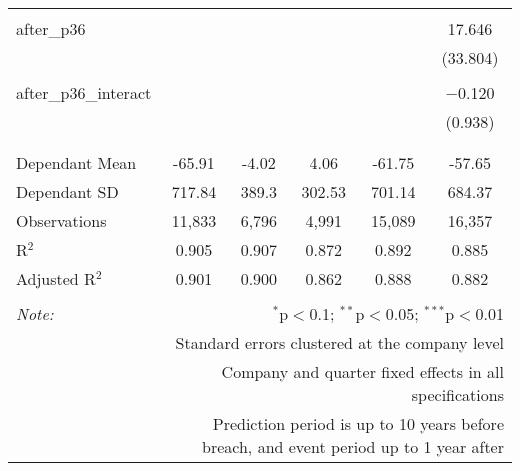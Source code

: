 \begin{table}[!htbp]
\begin{tabular}{@{\extracolsep{5pt}}lccccc}
  & & & & & \\ 
 after\_p36 &  &  &  &  & 17.646 \\ 
  &  &  &  &  & (33.804) \\ 
  & & & & & \\ 
 after\_p36\_interact &  &  &  &  & $-$0.120 \\ 
  &  &  &  &  & (0.938) \\ 
  & & & & & \\ 
\hline \\[-1.8ex] 
Dependant Mean & -65.91 & -4.02 & 4.06 & -61.75 & -57.65 \\ 
Dependant SD & 717.84 & 389.3 & 302.53 & 701.14 & 684.37 \\ 
Observations & 11,833 & 6,796 & 4,991 & 15,089 & 16,357 \\ 
R$^{2}$ & 0.905 & 0.907 & 0.872 & 0.892 & 0.885 \\ 
Adjusted R$^{2}$ & 0.901 & 0.900 & 0.862 & 0.888 & 0.882 \\ 
\hline 
\hline \\[-1.8ex] 
\textit{Note:}  & \multicolumn{5}{r}{$^{*}$p$<$0.1; $^{**}$p$<$0.05; $^{***}$p$<$0.01} \\ 
 & \multicolumn{5}{r}{Standard errors clustered at the company level} \\ 
 & \multicolumn{5}{r}{Company and quarter fixed effects in all specifications} \\ 
 & \multicolumn{5}{r}{Prediction period is up to 10 years before breach, and event period up to 1 year after} \\ 
\end{tabular} 
\end{table} 
